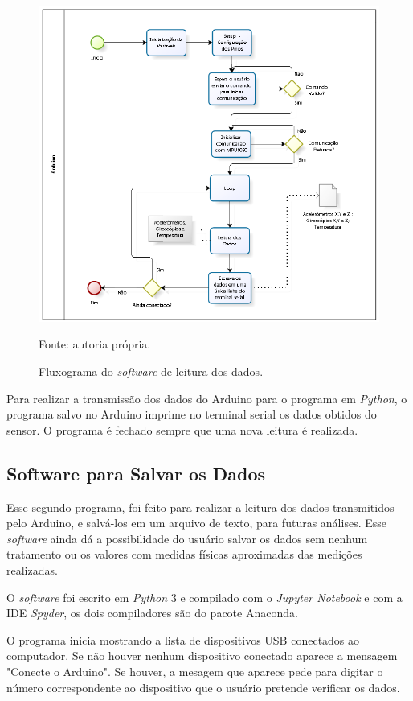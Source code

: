 		\begin{figure}[h]
			\centering
			\includegraphics[keepaspectratio=true,scale=0.9]{figuras/diagrama_embarcado.PNG}
			\caption{Fluxograma do \textit{software} de leitura dos dados. }
			Fonte: autoria própria. 
			\label{fluxograma_arduino}	
		\end{figure}
		
		Para realizar a transmissão dos dados do Arduino para o programa em \textit{Python}, o programa salvo no Arduino imprime no terminal serial os dados obtidos do sensor. O programa é fechado sempre que uma nova leitura é realizada.
		 
\subsection{Software para Salvar os Dados}
		Esse segundo programa, foi feito para realizar a leitura dos dados transmitidos pelo Arduino, e salvá-los em um arquivo de texto, para futuras análises. Esse \textit{software} ainda dá a possibilidade do usuário salvar os dados sem nenhum tratamento ou os valores com medidas físicas aproximadas das medições realizadas. 
		
		O \textit{software} foi escrito em \textit{Python} 3 e compilado com o \textit{Jupyter Notebook} e com a IDE \textit{Spyder}, os dois compiladores são do pacote Anaconda. 
		
		O programa inicia mostrando a lista de dispositivos USB conectados ao computador. Se não houver nenhum dispositivo conectado aparece a mensagem "Conecte o Arduino". Se houver, a mesagem que aparece pede para digitar o número correspondente ao dispositivo que o usuário pretende verificar os dados. 
		

